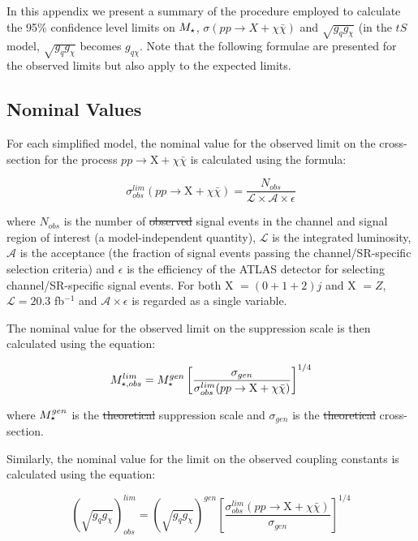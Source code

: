 In this appendix we present a summary of the procedure employed to calculate the 95\% confidence level limits on $M_{\star}$, \st{$\sigma(pp \rightarrow X + \chi\bar{\chi})$} and $\sqrt{g_{q}g_{\chi}}$ (in the $tS$ model, $\sqrt{g_{q}g_{\chi}}$ becomes $g_{q \chi}$. Note that the following formulae are presented for the observed limits but also apply to the expected limits.

\subsection{Nominal Values}
For each simplified model, the nominal value for the observed limit on the cross-section for the process $pp \rightarrow \mathrm{X} + \chi\bar{\chi}$ is calculated using the formula:

\begin{equation}
\label{sigma_nom}
\sigma_{obs}^{lim}(pp \rightarrow \mathrm{X} + \chi\bar{\chi}) = \frac{N_{obs}}{\mathcal{L}\times\mathcal{A}\times\epsilon}
\end{equation}

where $N_{obs}$ is  the number of \st{observed} signal events in the channel and signal region of interest (a model-independent quantity), $\mathcal{L}$ is the integrated luminosity, $\mathcal{A}$ is the acceptance (the fraction of signal events passing the channel/SR-specific selection criteria) and $\epsilon$ is the efficiency of the ATLAS detector for selecting channel/SR-specific signal events. For both X $= (0 + 1 + 2)j$ and X $=Z$, $\mathcal{L}=20.3$ fb$^{-1}$ and $\mathcal{A}\times\epsilon$ is regarded as a single variable.

The nominal value for the observed limit on the suppression scale is then calculated using the equation:

\begin{equation}
\label{M_*_nom}
M_{\star, obs}^{lim} = M_{\star}^{gen}\left[\frac{\sigma_{gen}}{\sigma_{obs}^{lim}(pp \rightarrow \mathrm{X} + \chi\bar{\chi})}\right]^{1/4}
\end{equation}

where $M_{\star}^{gen}$ is the \st{theoretical}  suppression scale and $\sigma_{gen}$ is the \st{theoretical}  cross-section.

Similarly, the nominal value for the limit on the observed coupling constants is calculated using the equation:

\begin{equation}
\label{coupling_nom}
(\sqrt{g_{q}g_{\chi}})_{obs}^{lim} = (\sqrt{g_{q}g_{\chi}})^{gen}\left[\frac{\sigma_{obs}^{lim}(pp \rightarrow \mathrm{X} + \chi\bar{\chi})}{\sigma_{gen}}\right]^{1/4}
\end{equation}

